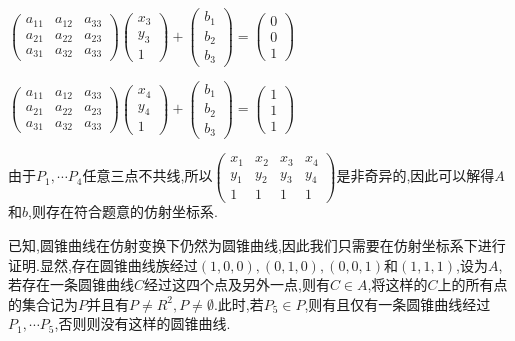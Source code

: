 \documentclass[UTF8]{book}
\begin{document}
			
			$\left(\begin{array}{lll}{a_{11}} & {a_{12}} & {a_{33}} \\ {a_{21}} & {a_{22}} & {a_{23}} \\ {a_{31}} & {a_{32}} & {a_{33}}\end{array}\right)\left(\begin{array}{l}{x_{3}} \\ {y_{3}} \\ 1\end{array}\right)+\left(\begin{array}{l}{b_{1}} \\ {b_{2}} \\ {b_{3}}\end{array}\right)=\left(\begin{array}{c}{0} \\ {0} \\ {1}\end{array}\right)$
		
		
			$\left(\begin{array}{lll}{a_{11}} & {a_{12}} & {a_{33}} \\ {a_{21}} & {a_{22}} & {a_{23}} \\ {a_{31}} & {a_{32}} & {a_{33}}\end{array}\right)\left(\begin{array}{l}{x_{4}} \\ {y_{4}} \\ 1\end{array}\right)+\left(\begin{array}{l}{b_{1}} \\ {b_{2}} \\ {b_{3}}\end{array}\right)=\left(\begin{array}{c}{1} \\ {1} \\ {1}\end{array}\right)$
			
			
			由于$ P_{1},\cdots P_{4} $任意三点不共线,所以$ \left(\begin{array}{llll}{x_{1}} & {x_{2}} & {x_{3}}& {x_{4}} \\ {y_{1}} & {y_{2}} & {y_{3}}& {y_{4}} \\ 1 & 1 & 1& 1\end{array}\right) $是非奇异的,因此可以解得$ A $和$ b $,则存在符合题意的仿射坐标系.
			
			
			已知,圆锥曲线在仿射变换下仍然为圆锥曲线,因此我们只需要在仿射坐标系下进行证明.显然,存在圆锥曲线族经过$ (1,0,0),(0,1,0),(0,0,1) $和$ (1,1,1) $,设为$ A $,若存在一条圆锥曲线$ C $经过这四个点及另外一点,则有$ C \in A $,将这样的$ C $上的所有点的集合记为$ P $并且有$ P \not = R^{2},P \not = \emptyset $.此时,若$ P_{5} \in P$,则有且仅有一条圆锥曲线经过$ P_{1},\cdots P_{5} $,否则则没有这样的圆锥曲线.
\end{document}
